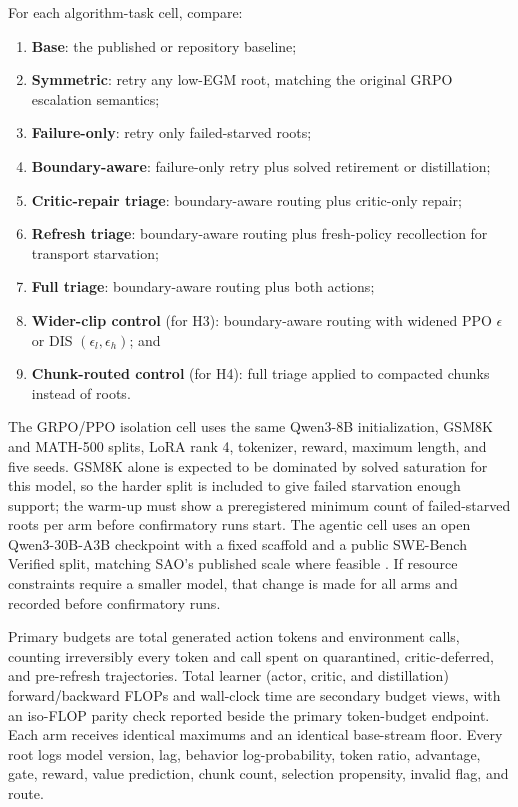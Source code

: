 \documentclass{article}
\begin{document}
For each algorithm-task cell, compare:
\begin{enumerate}[leftmargin=*,itemsep=2pt]
  \item \textbf{Base}: the published or repository baseline;
  \item \textbf{Symmetric}: retry any low-EGM root, matching the original GRPO
  escalation semantics;
  \item \textbf{Failure-only}: retry only failed-starved roots;
  \item \textbf{Boundary-aware}: failure-only retry plus solved retirement or
  distillation;
  \item[5a.] \textbf{Critic-repair triage}: boundary-aware routing plus
  critic-only repair;
  \item[5b.] \textbf{Refresh triage}: boundary-aware routing plus fresh-policy
  recollection for transport starvation;
  \item[6.] \textbf{Full triage}: boundary-aware routing plus both actions;
  \item[7.] \textbf{Wider-clip control} (for H3): boundary-aware routing with
  widened PPO $\epsilon$ or DIS $(\epsilon_l,\epsilon_h)$; and
  \item[8.] \textbf{Chunk-routed control} (for H4): full triage applied to
  compacted chunks instead of roots.
\end{enumerate}
The GRPO/PPO isolation cell uses the same Qwen3-8B initialization, GSM8K and
MATH-500 splits, LoRA rank 4, tokenizer, reward, maximum length, and five seeds.
GSM8K alone is expected to be dominated by solved saturation for this model, so
the harder split is included to give failed starvation enough support; the
warm-up must show a preregistered minimum count of failed-starved roots per arm
before confirmatory runs start.  The agentic
cell uses an open Qwen3-30B-A3B checkpoint with a fixed scaffold and a public
SWE-Bench Verified split, matching SAO's published scale where feasible
\citep{hou2026sao}.  If resource constraints require a smaller model, that
change is made for all arms and recorded before confirmatory runs.

Primary budgets are total generated action tokens and environment calls,
counting irreversibly every token and call spent on quarantined, critic-deferred,
and pre-refresh trajectories.  Total learner (actor, critic, and distillation)
forward/backward FLOPs and wall-clock time are secondary budget views, with an
iso-FLOP parity check reported beside the primary token-budget endpoint.  Each
arm receives identical maximums and an identical base-stream floor.  Every
root logs model version, lag, behavior log-probability, token ratio, advantage,
gate, reward, value prediction, chunk count, selection propensity, invalid
flag, and route.
\end{document}
